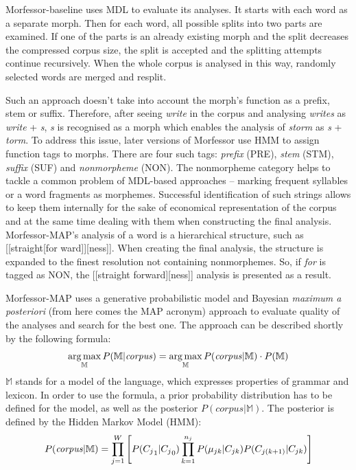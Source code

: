 Morfessor-baseline uses MDL to evaluate its analyses. It starts with each word as a separate morph. Then for each word, all possible splits into two parts are examined. If one of the parts is an already existing morph and the split decreases the compressed corpus size, the split is accepted and the splitting attempts continue recursively. When the whole corpus is analysed in this way, randomly selected words are merged and resplit.

Such an approach doesn't take into account the morph's function as a prefix, stem or suffix. Therefore, after seeing \emph{write} in the corpus and analysing \emph{writes} as \emph{write} + \emph{s}, \emph{s} is recognised as a morph which enables the analysis of \emph{storm} as \emph{s} + \emph{torm}. To address this issue, later versions of Morfessor use HMM to assign function tags to morphs. There are four such tags: \emph{prefix} (PRE), \emph{stem} (STM), \emph{suffix} (SUF) and \emph{nonmorpheme} (NON). The nonmorpheme category helps to tackle a common problem of MDL-based approaches -- marking frequent syllables or a word fragments as morphemes. Successful identification of such strings allows to keep them internally for the sake of economical representation of the corpus and at the same time dealing with them when constructing the final analysis. Morfessor-MAP's analysis of a word is a hierarchical structure, such as [[straight[for ward]][ness]]. When creating the final analysis, the structure is expanded to the finest resolution not containing nonmorphemes. So, if \emph{for} is tagged as NON, the [[straight forward][ness]] analysis is presented as a result.

Morfessor-MAP uses a generative probabilistic model and Bayesian \emph{maximum a posteriori} (from here comes the MAP acronym) approach to evaluate quality of the analyses and search for the best one. The approach can be described shortly by the following formula:
\[
\operatorname*{arg\,max}_{\mathbb{M}} P(\mathbb{M} | \mathit{corpus}) = \operatorname*{arg\,max}_{\mathbb{M}} P(\mathit{corpus} | \mathbb{M}) \cdot P(\mathbb{M})
\]
$\mathbb{M}$ stands for a model of the language, which expresses properties of grammar and lexicon. In order to use the formula, a prior probability distribution has to be defined for the model, as well as the posterior $P(\mathit{corpus} | \mathbb{M})$. The posterior is defined by the Hidden Markov Model (HMM):
\[
P(\mathit{corpus} | \mathbb{M}) = \prod_{j=1}^{W} \left[ P({C_j}_1 | {C_j}_0) \prod_{k=1}^{n_j} P(\mu_{jk} | C_{jk}) P(C_{j(k+1)} | C_{jk})\right] 
\]

